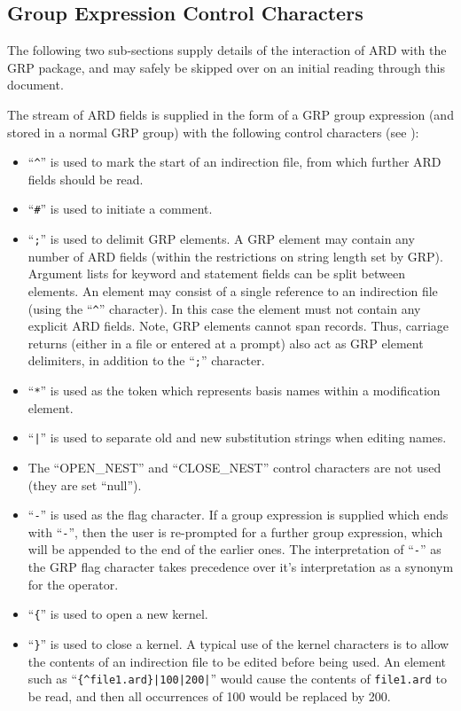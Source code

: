 \documentclass[11pt,nolof]{starlink}
\begin{document}
\subsection{\label{SEC:GRPCC}Group Expression Control Characters}
The following two sub-sections supply details of the interaction of ARD with the
GRP package, and may safely be skipped over on an initial reading through this
document.

The stream of ARD fields is supplied in the form of a GRP group expression (and
stored in a normal GRP group) with the following control characters (see
):

\begin{itemize}

\item ``\verb+^+'' is used to mark the start of an indirection file, from which
further ARD fields should be read.

\item ``\verb+#+'' is used to initiate a comment.

\item ``\verb+;+'' is used to delimit GRP elements. A GRP element may contain
any
number of ARD fields (within the restrictions on string length set by GRP).
Argument lists for keyword and statement fields can be split between elements.
An element may consist of a single reference to an indirection file (using the
``\verb+^+'' character). In this case the element must not contain any
explicit ARD fields. Note, GRP elements cannot span records. Thus,
carriage returns (either in a file or entered at a prompt) also act as GRP
element delimiters, in addition to the ``\verb+;+'' character.

\item ``\verb+*+'' is used as the token which represents basis names
within a modification element.

\item ``\verb+|+'' is used to separate old and new substitution strings
when editing names.

\item The ``OPEN\_NEST'' and ``CLOSE\_NEST'' control characters are not used
(they are set ``null'').

\item ``\verb+-+'' is used as the flag character. If a group expression is
supplied which ends with ``\verb+-+'', then the user is re-prompted for a
further group expression, which will be appended to the end of the earlier ones.
The interpretation of ``\verb+-+'' as the GRP flag character takes precedence
over it's interpretation as a synonym for the  operator.

\item ``\verb+{+'' is used to open a new kernel.

\item ``\verb+}+'' is used to close a kernel. A typical use of the kernel
characters is to allow the contents of an indirection file to be edited before
being used. An element such as ``\verb+{^file1.ard}|100|200|+'' would cause the
contents of \verb+file1.ard+ to be read, and then all occurrences of 100 would
be replaced by 200.

\end{itemize}
\end{document}
